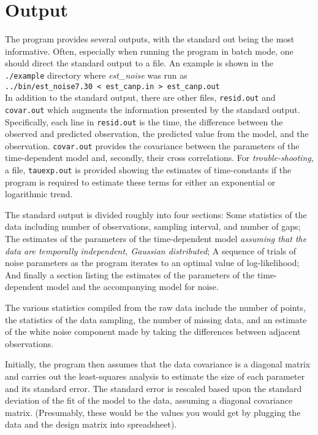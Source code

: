 \documentclass[12pt]{amsart}
\begin{document}
\section{Output}

The program provides several outputs, with the standard out being the most informative. Often, especially
when running the program in batch mode, one should direct the standard output to a file. An example
is shown in the \texttt{./example} directory where \textit{est\_noise} was run as \\
\texttt{../bin/est\_noise7.30 < est\_canp.in > est\_canp.out} \\
In addition to the standard output, there are other files, \texttt{resid.out} and \texttt{covar.out} which augments the information
presented by the standard output. Specifically, each line in \texttt{resid.out} is the time, the difference
between the observed and predicted observation, the predicted value from the model, and the observation.
\texttt{covar.out} provides the covariance between the parameters of the time-dependent model and, secondly,
their cross correlations.  For \textit{trouble-shooting}, a file, \texttt{tauexp.out} is provided showing the estimates
of time-constants if the program is required to estimate these terms for either an exponential or logarithmic trend.

The standard output is divided roughly into four sections: Some statistics of the data including number of observations,
sampling interval, and number of gaps; The estimates
of the parameters of the time-dependent model \textit{assuming that the data are temporally independent, Gaussian
distributed}; A sequence of trials of noise parameters as the program iterates to an optimal value of log-likelihood;
And finally a section listing the estimates of the parameters of the time-dependent model and the accompanying
model for noise.

The various statistics compiled from the raw data include the number of points, the statistics of the data sampling,
the number of missing data, and an estimate of the white noise component made by taking the differences
between adjacent observations.

Initially, the program then assumes that the data covariance is a diagonal matrix and carries out the least-squares analysis
to estimate the size of each parameter and its standard error.  The standard error is rescaled based upon the
standard deviation of the fit of the model to the data, assuming a diagonal covariance matrix. (Presumably,
these would be the values you would get by plugging the data and the design matrix into spreadsheet).
\end{document}
